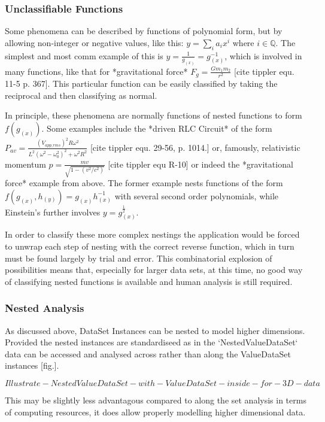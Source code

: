 \documentclass[main.tex]{subfiles}
\begin{document}
  \subsubsection{Unclassifiable Functions}
  
  Some phenomena can be described by functions of polynomial form, but by allowing non-integer or negative values, like this: $y=\sum_i a_i x^i$ where $i \in \mathbb{Q} $.   The simplest and most comm example of this is $y=\frac{1}{g_{(x)}}=g_{(x)}^{-1}$, which is involved in many functions, like that for *gravitational force* $F_g=\frac{G m_1 m_2}{r^2}$ [cite tippler equ. 11-5 p. 367]. This particular function can be easily classified by taking the reciprocal and then classifying as normal.
  
  In principle, these phenomena are normally functions of nested functions to form $f(g_{(x)})$. Some examples include the *driven RLC Circuit* of the form $P_{av}= \frac{ (V_{app\_rms})^2R\omega^2 }{ L^2(\omega^2-\omega_0^2)^2+\omega^2R^2 }$  [cite tippler equ. 29-56, p. 1014.] or, famously, relativistic momentum $p=\frac{m v}{\sqrt{1-(v^2/c^2)}}$ [cite tippler equ R-10] or indeed the *gravitational force* example from above. The former example nests functions of the form $f(g_{(x)},h_{(y)})=g_{(x)}h_{(x)}^{-1}$ with several second order polynomials, while Einstein's further involves $y=g_{(x)}^{\frac{1}{2}}$.
  
  In order to classify these more complex nestings the application would be forced to unwrap each step of nesting with the correct reverse function, which in turn must be found largely by trial and error. This combinatorial explosion of possibilities means that, especially for larger data sets, at this time, no good way of classifying nested functions is available and human analysis is still required.
  
  \subsubsection{Nested Analysis}
  
  As discussed above, DataSet Instances can be nested to model higher dimensions. Provided the nested instances are standardiseed as in the `NestedValueDataSet` data can be accessed and analysed across rather than along the ValueDataSet instances [fig.]. 
  
  \[Illustrate-NestedValueDataSet-with-ValueDataSet-inside-for-3D-data\]
  
  This may be slightly less advantagous compared to along the set analysis in terms of computing resources, it does allow properly modelling higher dimensional data. 
  
\end{document}
